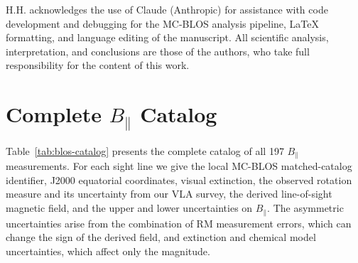 \documentclass[twocolumn]{aastex701}
\begin{document}
\begin{acknowledgments}
H.H. acknowledges the use of Claude (Anthropic) for assistance with code
development and debugging for the MC-BLOS analysis pipeline, \LaTeX{}
formatting, and language editing of the manuscript. All scientific analysis,
interpretation, and conclusions are those of the authors, who take full
responsibility for the content of this work.
\end{acknowledgments}




\appendix

\section{Complete $B_\parallel$ Catalog}
\label{app:catalog}

Table~\ref{tab:blos-catalog} presents the complete catalog of all 197
$B_\parallel$ measurements. For each sight line we give the local MC-BLOS
matched-catalog identifier, J2000 equatorial coordinates, visual extinction,
the observed rotation measure and its uncertainty from our
VLA survey, the derived line-of-sight magnetic field, and the upper and lower
uncertainties on $B_\parallel$. The asymmetric uncertainties arise from the
combination of RM measurement errors, which can change the sign of the derived
field, and extinction and chemical model uncertainties, which affect only the
magnitude.



\end{document}
